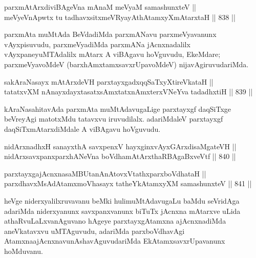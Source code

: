 
\begin{shl}
parxmAtArxdiviBAgeVna mAnaM meVyaM samashunxteV || \\
meVyeVnA\s \s pwtx tu tadhavxsitxmeVRyayAthAtamxyXmAtarxtaH \hfill || 838 ||  
\end{shl}

\begin{artha}
parxmAta muMtAda BeVdadiMda parxmANavu parxmeVyavanunx vAyxpisuvudu, parxmeVyadiMda parxmANa jAcnxnadalilx vAyxpaneyuMTAdalilx mAtarx A viBAgavu hoVguvudu, EkeMdare; parxmeVyavoMdeV (barxhAmxtamxsavxrUpavoMdeV) nijavAgiruvudariMda.
\end{artha}

\begin{shl}
sakAraNasayx mAtArxdeVH parxtayxgadxqqSaTxyXtireVkataH || \\
tatatxvXM nAnayxdayxtasatxsAmxtatxnAmxterxVNeYva tadadhxtiH \hfill || 839 ||  
\end{shl}

\begin{artha}
kAraNasahitavAda parxmAta muMtAdavugaLige parxtayxgf daqSiTxge beVreyAgi matotxMdu tatavxvu iruvudilalx. adariMdaleV parxtayxgf daqSiTxmAtarxdiMdale A viBAgavu hoVguvudu.
\end{artha}


\begin{shl}
nidArxnadhxH sanayxthA savxpenxV hayxginxvAyxGArxdisaMgateVH || \\
nidArxsavxpanxparxhANeVna boVdhamAtArxthaRBAgaBxveVtf \hfill || 840 ||  
\end{shl}
				
\begin{shl}
parxtayxgajAcnxnasaMBUtanAnAtovxVtathxparxboVdhataH || \\
parxdhavxMsAdAtamxmoVhasayx tatheYkAtamxyXM samashunxteV \hfill || 841 ||  
\end{shl}

\begin{artha}
heVge niderxyalilxruvavanu beMki hulimuMtAdavugaLu baMdu seVridAga adariMda niderxyanunx savxpanxvanunx biTuTx jAcnxna mAtarxve uLida athaRvuLaLxvanAguvano hAgeye parxtayxgAtamxna ajAcnxnadiMda aneVkatavxvu uMTAguvudu, adariMda parxboVdhavAgi Atamxna\break ajAcnxnavunAshavAguvudariMda EkAtamxsavxrUpavanunx hoMduvanu.
\end{artha}

